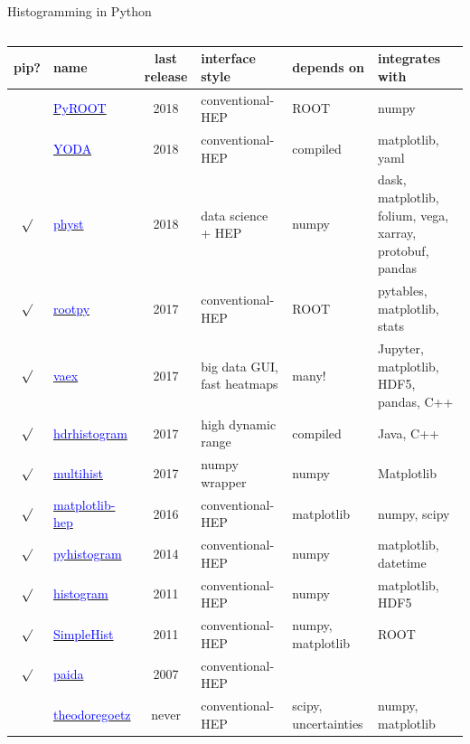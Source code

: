 \documentclass[aspectratio=169]{beamer}
\begin{document}
\begin{frame}{Histogramming in Python}
\scriptsize
\vspace{0.25 cm}
\begin{columns}
\begin{tabular}{c l c p{2.5 cm} p{1.5 cm} p{4.75 cm}}
pip? & name & last release & interface style & depends on & integrates with \\\hline
& \href{https://root.cern.ch/pyroot}{\textcolor{blue}{PyROOT}} & 2018 & conventional-HEP & ROOT & numpy \\
& \href{https://yoda.hepforge.org/pydoc}{\textcolor{blue}{YODA}} & 2018 & conventional-HEP & compiled & matplotlib, yaml \\
$\surd$ & \href{https://pypi.python.org/pypi/physt}{\textcolor{blue}{physt}} & 2018 & data science + HEP & numpy & dask, matplotlib, folium, vega, xarray, protobuf, pandas \\
$\surd$ & \href{https://pypi.org/project/rootpy}{\textcolor{blue}{rootpy}} & 2017 & conventional-HEP & ROOT & pytables, matplotlib, stats \\
$\surd$ & \href{https://vaex.io}{\textcolor{blue}{vaex}} & 2017 & big data GUI, fast heatmaps & many! & Jupyter, matplotlib, HDF5, pandas, C++ \\
$\surd$ & \href{https://pypi.python.org/pypi/hdrhistogram}{\textcolor{blue}{hdrhistogram}} & 2017 & high dynamic range & compiled & Java, C++ \\
$\surd$ & \href{https://pypi.python.org/pypi/multihist}{\textcolor{blue}{multihist}} & 2017 & numpy wrapper & numpy & Matplotlib \\
$\surd$ & \href{https://github.com/ibab/matplotlib-hep}{\textcolor{blue}{matplotlib-hep}} & 2016 & conventional-HEP & matplotlib & numpy, scipy \\
$\surd$ & \href{https://pypi.python.org/pypi/pyhistogram}{\textcolor{blue}{pyhistogram}} & 2014 & conventional-HEP & numpy & matplotlib, datetime \\
$\surd$ & \href{https://pypi.python.org/pypi/histogram}{\textcolor{blue}{histogram}} & 2011 & conventional-HEP & numpy & matplotlib, HDF5 \\
$\surd$ & \href{https://pypi.python.org/pypi/SimpleHist}{\textcolor{blue}{SimpleHist}} & 2011 & conventional-HEP & numpy, matplotlib & ROOT \\
$\surd$ & \href{https://pypi.org/project/paida}{\textcolor{blue}{paida}} & 2007 & conventional-HEP & & \\
& \href{https://github.com/theodoregoetz/histogram}{\textcolor{blue}{theodoregoetz}} & never & conventional-HEP & scipy, \mbox{uncertainties} & numpy, matplotlib \\

\end{tabular}
\end{columns}
\end{frame}
\end{document}
